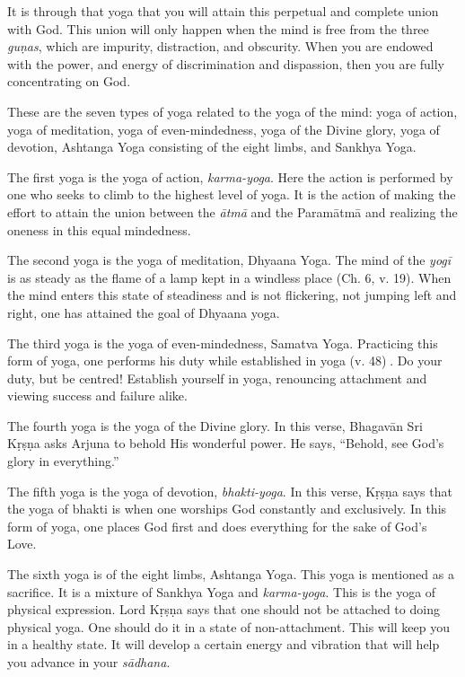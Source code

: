 It is through that yoga that you will attain this perpetual and complete union with God. This union will only happen when the mind is free from the three \textit{guṇas}, which are impurity, distraction, and obscurity. When you are endowed with the power, and energy of discrimination and dispassion, then you are fully concentrating on God.

These are the seven types of yoga related to the yoga of the mind: yoga of action, yoga of meditation, yoga of even-mindedness, yoga of the Divine glory, yoga of devotion, Ashtanga Yoga consisting of the eight limbs, and Sankhya Yoga.

The first yoga is the yoga of action, \textit{karma-yoga}. Here the action is performed by one who seeks to climb to the highest level of yoga. It is the action of making the effort to attain the union between the \textit{ātmā} and the Paramātmā and realizing the oneness in this equalmindedness.

The second yoga is the yoga of meditation, Dhyaana Yoga. The mind of the \textit{yogī} is as steady as the flame of a lamp kept in a windless place (Ch. 6, v. 19). When the mind enters this state of steadiness and is not flickering, not jumping left and right, one has attained the goal of Dhyaana yoga.

The third yoga is the yoga of even-mindedness, Samatva Yoga. Practicing this form of yoga, one performs his duty while established in yoga (v. 48). Do your duty, but be centred! Establish yourself in yoga, renouncing attachment and viewing success and failure alike.

The fourth yoga is the yoga of the Divine glory. In this verse, Bhagavān Sri Kṛṣṇa asks Arjuna to behold His wonderful power. He says, “Behold, see God’s glory in everything.”

The fifth yoga is the yoga of devotion, \textit{bhakti-yoga}. In this verse, Kṛṣṇa says that the yoga of bhakti is when one worships God constantly and exclusively. In this form of yoga, one places God first and does everything for the sake of God’s Love.

The sixth yoga is of the eight limbs, Ashtanga Yoga. This yoga is mentioned as a sacrifice. It is a mixture of Sankhya Yoga and \textit{karma-yoga}. This is the yoga of physical expression. Lord Kṛṣṇa says that one should not be attached to doing physical yoga. One should do it in a state of non-attachment. This will keep you in a healthy state. It will develop a certain energy and vibration that will help you advance in your \textit{sādhana}.

